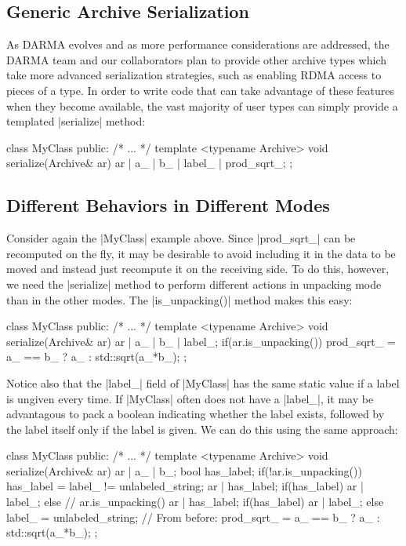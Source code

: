 \subsection{Generic Archive Serialization}

As \gls{DARMA} evolves and as more performance considerations are addressed,
the \gls{DARMA} team and our collaborators plan to provide other \gls{archive} types which
take more advanced serialization strategies, such as enabling \gls{RDMA}
access to pieces of a type.  In order to write code that can take advantage of
these features when they become available, the vast majority of user types can
simply provide a templated |serialize| method:
\begin{CppCodeNumb}
class MyClass {
  public:
    /* ... */
    template <typename Archive>
    void serialize(Archive& ar) {
      ar | a_ | b_ | label_ | prod_sqrt_;
    }
};
\end{CppCodeNumb}

\subsection{Different Behaviors in Different Modes}

Consider again the |MyClass| example above.  Since |prod_sqrt_| can be
recomputed on the fly, it may be desirable to avoid including it in the data to
be moved and instead just recompute it on the receiving side.  To do this, however,
we need the |serialize| method to perform different actions in unpacking mode
than in the other modes.  The |is_unpacking()| method makes this easy:
%
\begin{CppCodeNumb}
class MyClass {
  public:
    /* ... */
    template <typename Archive>
    void serialize(Archive& ar) {
      ar | a_ | b_ | label_;
      if(ar.is_unpacking())
        prod_sqrt_ = a_ == b_ ? a_ : std::sqrt(a_*b_);
    }
};
\end{CppCodeNumb}
%
Notice also that the |label_| field of |MyClass| has the same static value if a
label is ungiven every time.  If |MyClass| often does not have a |label_|, it
may be advantagous to pack a boolean indicating whether the label exists,
followed by the label itself only if the label is given.  We can do this using
the same approach:
\begin{CppCodeNumb}
class MyClass {
  public:
    /* ... */
    template <typename Archive>
    void serialize(Archive& ar) {
      ar | a_ | b_;
      bool has_label;
      if(!ar.is_unpacking()) {
        has_label = label_ != unlabeled_string;
        ar | has_label;
        if(has_label) ar | label_;
      }
      else { // ar.is_unpacking()
        ar | has_label;
        if(has_label) ar | label_;
        else label_ = unlabeled_string;    
        // From before:
        prod_sqrt_ = a_ == b_ ? a_ : std::sqrt(a_*b_);
      }
    }
};
\end{CppCodeNumb}

